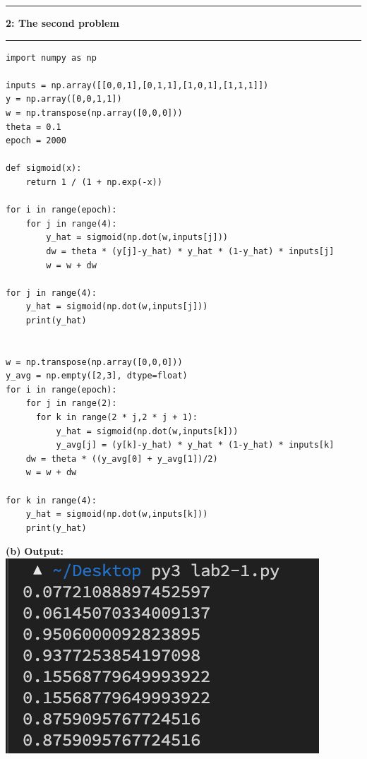 \documentclass[11pt]{article}
\newcommand\question[2]{\vspace{.25in}\hrule\textbf{#1: #2}\vspace{.5em}\hrule\vspace{.10in}}
\renewcommand\part[1]{\vspace{.10in}\textbf{(#1)}}
\newcommand\correctness{\vspace{.10in}\textbf{Output: }}
\begin{document}
\question{2}{The second problem}
\begin{lstlisting}
import numpy as np

inputs = np.array([[0,0,1],[0,1,1],[1,0,1],[1,1,1]])
y = np.array([0,0,1,1])
w = np.transpose(np.array([0,0,0]))
theta = 0.1
epoch = 2000

def sigmoid(x):
    return 1 / (1 + np.exp(-x))

for i in range(epoch):
    for j in range(4):
        y_hat = sigmoid(np.dot(w,inputs[j]))
        dw = theta * (y[j]-y_hat) * y_hat * (1-y_hat) * inputs[j]
        w = w + dw

for j in range(4):
    y_hat = sigmoid(np.dot(w,inputs[j]))
    print(y_hat)


w = np.transpose(np.array([0,0,0]))
y_avg = np.empty([2,3], dtype=float)
for i in range(epoch):
    for j in range(2):
      for k in range(2 * j,2 * j + 1):
          y_hat = sigmoid(np.dot(w,inputs[k]))
          y_avg[j] = (y[k]-y_hat) * y_hat * (1-y_hat) * inputs[k]
    dw = theta * ((y_avg[0] + y_avg[1])/2)
    w = w + dw

for k in range(4):
    y_hat = sigmoid(np.dot(w,inputs[k]))
    print(y_hat)
\end{lstlisting}

\part{b} \correctness\\
\includegraphics[scale=1]{ot2.png}
\end{document}
